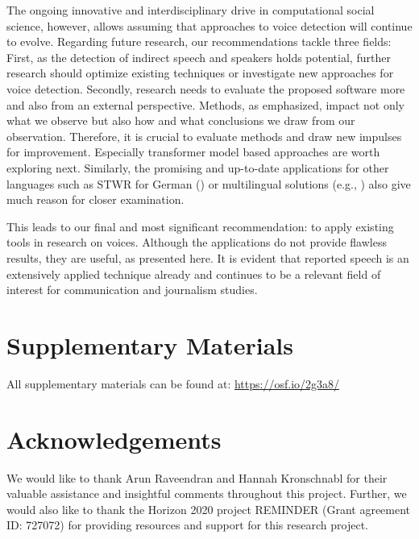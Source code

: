\documentclass{ccr}
\begin{document}
The ongoing innovative and interdisciplinary drive in computational
social science, however, allows assuming that approaches to voice
detection will continue to evolve. Regarding future research, our
recommendations tackle three fields: First, as the detection of indirect
speech and speakers holds potential, further research should optimize
existing techniques or investigate new approaches for voice detection.
Secondly, research needs to evaluate the proposed software more and also
from an external perspective. Methods, as emphasized, impact not only
what we observe but also how and what conclusions we draw from our
observation. Therefore, it is crucial to evaluate methods and draw new
impulses for improvement. Especially transformer model based approaches
are worth exploring next. Similarly, the promising and up-to-date
applications for other languages such as STWR for German (\cite{brunner2020bert}) or multilingual solutions (e.g., \cite{byszuk2020detecting}) also
give much reason for closer examination.

This leads to our final and most significant recommendation: to apply
existing tools in research on voices. Although the
applications do not provide flawless results, they are useful, as
presented here. It is evident that reported speech is an
extensively applied technique already and continues to be a relevant
field of interest for communication and journalism studies.


\section{Supplementary Materials}
All supplementary materials can be found at:
\url{https://osf.io/2g3a8/}


\section{Acknowledgements}
We would like to thank Arun Raveendran and Hannah Kronschnabl for their valuable assistance and insightful comments throughout this project. Further, we would also like to thank the Horizon 2020 project REMINDER (Grant agreement ID: 727072) for providing resources and support for this research project.

\nocite{*}

\printbibliography
\end{document}
